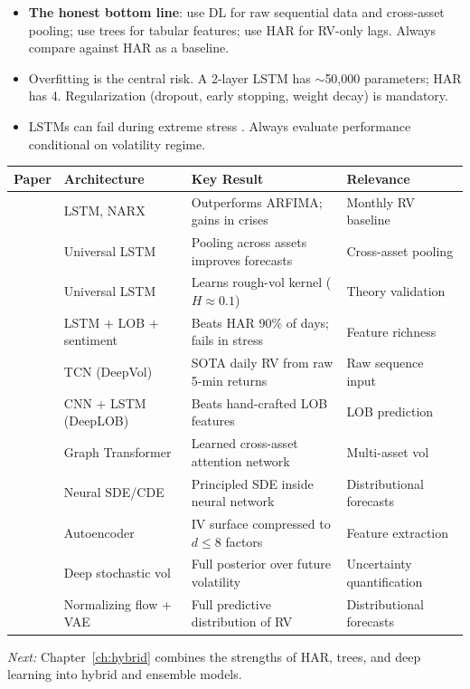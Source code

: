 \begin{itemize}
  \item \textbf{The honest bottom line}: use DL for raw sequential data and cross-asset pooling; use trees for tabular features; use HAR for RV-only lags.
    Always compare against HAR as a baseline.

  \item Overfitting is the central risk. A 2-layer LSTM has $\sim$50,000 parameters; HAR has 4. Regularization (dropout, early stopping, weight decay) is mandatory.

  \item LSTMs can fail during extreme stress \citep{RahimikiaPoon2020}. Always evaluate performance conditional on volatility regime.
\end{itemize}

\begin{center}
\small
\begin{tabular}{llll}
\toprule
\textbf{Paper} & \textbf{Architecture} & \textbf{Key Result} & \textbf{Relevance} \\
\midrule
\citet{Bucci2020}
  & LSTM, NARX
  & Outperforms ARFIMA; gains in crises
  & Monthly RV baseline \\[3pt]
\citet{SirignanoCont2019}
  & Universal LSTM
  & Pooling across assets improves forecasts
  & Cross-asset pooling \\[3pt]
\citet{RosenbaumZhang2022}
  & Universal LSTM
  & Learns rough-vol kernel ($H \approx 0.1$)
  & Theory validation \\[3pt]
\citet{RahimikiaPoon2020}
  & LSTM + LOB + sentiment
  & Beats HAR 90\% of days; fails in stress
  & Feature richness \\[3pt]
\citet{MorenoPinoZohren2022DeepVol}
  & TCN (DeepVol)
  & SOTA daily RV from raw 5-min returns
  & Raw sequence input \\[3pt]
\citet{ZhangZohrenRoberts2019DeepLOB}
  & CNN + LSTM (DeepLOB)
  & Beats hand-crafted LOB features
  & LOB prediction \\[3pt]
\citet{ChenRobert2022}
  & Graph Transformer
  & Learned cross-asset attention network
  & Multi-asset vol \\[3pt]
\citet{Kidger2021NeuralSDE}
  & Neural SDE/CDE
  & Principled SDE inside neural network
  & Distributional forecasts \\[3pt]
\citet{DingLuCheung2025}
  & Autoencoder
  & IV surface compressed to $d \le 8$ factors
  & Feature extraction \\[3pt]
\citet{XuChen2021}
  & Deep stochastic vol
  & Full posterior over future volatility
  & Uncertainty quantification \\[3pt]
\citet{DuMoriyamaTanakaIshii2023}
  & Normalizing flow + VAE
  & Full predictive distribution of RV
  & Distributional forecasts \\
\bottomrule
\end{tabular}
\end{center}

\bigskip
\noindent\textit{Next:} Chapter~\ref{ch:hybrid} combines the strengths of HAR, trees, and deep learning into hybrid and ensemble models.

